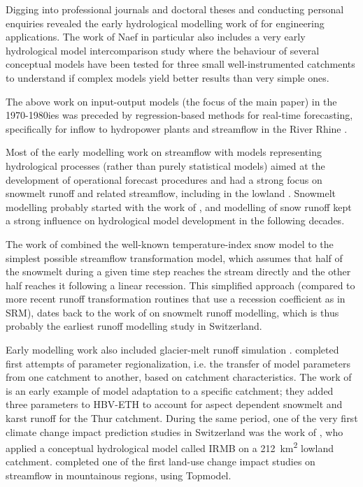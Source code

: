 \documentclass{article}
\begin{document}
Digging into professional journals and doctoral theses and conducting personal enquiries revealed the early hydrological modelling work of \citet{naef1974} for engineering applications. The work of Naef in particular also includes a very early hydrological model intercomparison study \citep{naef1977} where the behaviour of several conceptual models have been tested for three small well-instrumented catchments to understand if complex models yield better results than very simple ones.

The above work on input-output models (the focus of the main paper) in the 1970-1980ies was preceded by regression-based methods for real-time forecasting, specifically for inflow to hydropower plants \citep{jensenlang1973} and streamflow in the River Rhine \citep[e.g. to predict downstream summer droughts,][]{lugiez1969}.

Most of the early modelling work on streamflow with models representing hydrological processes (rather than purely statistical models) aimed at the development of operational forecast procedures and had a strong focus on snowmelt runoff and related streamflow, including in the lowland \citep{braun1986}. Snowmelt modelling probably started with the work of \citet{hoeck1952}, and modelling of snow runoff kept a strong influence on hydrological model development in the following decades.

The work of \citet{braun1986} combined the well-known temperature-index snow model \citep[underlying also the SRM model;][]{martinec1975} to the simplest possible streamflow transformation model, which assumes that half of the snowmelt during a given time step reaches the stream directly and the other half reaches it following a linear recession. This simplified approach (compared to more recent runoff transformation routines that use a recession coefficient as in SRM), dates back to the work of \citet{martinec1970} on snowmelt runoff modelling, which is thus probably the earliest runoff modelling study in Switzerland. 

Early modelling work also included glacier-melt runoff simulation \citep[][who used a model called HBV3-ETH, not in use anymore]{braun90}. \citet{braun1992} completed first attempts of parameter regionalization, i.e. the transfer of model parameters from one catchment to another, based on catchment characteristics. The work of \citet{hottelet1993} is an early example of model adaptation to a specific catchment; they added three parameters to HBV-ETH to account for aspect dependent snowmelt and karst runoff for the Thur catchment.
During the same period, one of the very first climate change impact prediction studies in Switzerland was the work of \citet{bultot1992}, who applied a conceptual hydrological model called IRMB on a 212~km\textsuperscript{2} lowland catchment. \citet{jordan1990} completed one of the first land-use change impact studies on streamflow in mountainous regions, using Topmodel. 
\end{document}
